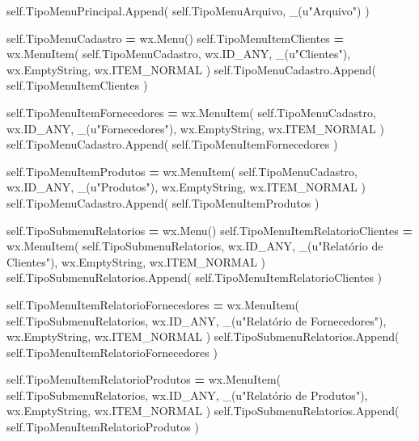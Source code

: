 \documentclass[
]{book}
\newenvironment{Shaded}{\begin{snugshade}}{\end{snugshade}}
\newcommand{\NormalTok}[1]{#1}
\newcommand{\OperatorTok}[1]{\textcolor[rgb]{0.81,0.36,0.00}{\textbf{#1}}}
\newcommand{\StringTok}[1]{\textcolor[rgb]{0.31,0.60,0.02}{#1}}
\newcommand{\VariableTok}[1]{\textcolor[rgb]{0.00,0.00,0.00}{#1}}
\begin{document}
\begin{Shaded}
\begin{Highlighting}[]
       \VariableTok{self}\NormalTok{.TipoMenuPrincipal.Append( }\VariableTok{self}\NormalTok{.TipoMenuArquivo, \_(}\StringTok{u"Arquivo"}\NormalTok{) )}

       \VariableTok{self}\NormalTok{.TipoMenuCadastro }\OperatorTok{=}\NormalTok{ wx.Menu()}
       \VariableTok{self}\NormalTok{.TipoMenuItemClientes }\OperatorTok{=}\NormalTok{ wx.MenuItem( }\VariableTok{self}\NormalTok{.TipoMenuCadastro, wx.ID\_ANY, \_(}\StringTok{u"Clientes"}\NormalTok{), wx.EmptyString, wx.ITEM\_NORMAL )}
       \VariableTok{self}\NormalTok{.TipoMenuCadastro.Append( }\VariableTok{self}\NormalTok{.TipoMenuItemClientes )}

       \VariableTok{self}\NormalTok{.TipoMenuItemFornecedores }\OperatorTok{=}\NormalTok{ wx.MenuItem( }\VariableTok{self}\NormalTok{.TipoMenuCadastro, wx.ID\_ANY, \_(}\StringTok{u"Fornecedores"}\NormalTok{), wx.EmptyString, wx.ITEM\_NORMAL )}
       \VariableTok{self}\NormalTok{.TipoMenuCadastro.Append( }\VariableTok{self}\NormalTok{.TipoMenuItemFornecedores )}

       \VariableTok{self}\NormalTok{.TipoMenuItemProdutos }\OperatorTok{=}\NormalTok{ wx.MenuItem( }\VariableTok{self}\NormalTok{.TipoMenuCadastro, wx.ID\_ANY, \_(}\StringTok{u"Produtos"}\NormalTok{), wx.EmptyString, wx.ITEM\_NORMAL )}
       \VariableTok{self}\NormalTok{.TipoMenuCadastro.Append( }\VariableTok{self}\NormalTok{.TipoMenuItemProdutos )}

       \VariableTok{self}\NormalTok{.TipoSubmenuRelatorios }\OperatorTok{=}\NormalTok{ wx.Menu()}
       \VariableTok{self}\NormalTok{.TipoMenuItemRelatorioClientes }\OperatorTok{=}\NormalTok{ wx.MenuItem( }\VariableTok{self}\NormalTok{.TipoSubmenuRelatorios, wx.ID\_ANY, \_(}\StringTok{u"Relatório de Clientes"}\NormalTok{), wx.EmptyString, wx.ITEM\_NORMAL )}
       \VariableTok{self}\NormalTok{.TipoSubmenuRelatorios.Append( }\VariableTok{self}\NormalTok{.TipoMenuItemRelatorioClientes )}

       \VariableTok{self}\NormalTok{.TipoMenuItemRelatorioFornecedores }\OperatorTok{=}\NormalTok{ wx.MenuItem( }\VariableTok{self}\NormalTok{.TipoSubmenuRelatorios, wx.ID\_ANY, \_(}\StringTok{u"Relatório de Fornecedores"}\NormalTok{), wx.EmptyString, wx.ITEM\_NORMAL )}
       \VariableTok{self}\NormalTok{.TipoSubmenuRelatorios.Append( }\VariableTok{self}\NormalTok{.TipoMenuItemRelatorioFornecedores )}

       \VariableTok{self}\NormalTok{.TipoMenuItemRelatorioProdutos }\OperatorTok{=}\NormalTok{ wx.MenuItem( }\VariableTok{self}\NormalTok{.TipoSubmenuRelatorios, wx.ID\_ANY, \_(}\StringTok{u"Relatório de Produtos"}\NormalTok{), wx.EmptyString, wx.ITEM\_NORMAL )}
       \VariableTok{self}\NormalTok{.TipoSubmenuRelatorios.Append( }\VariableTok{self}\NormalTok{.TipoMenuItemRelatorioProdutos )}


\end{Highlighting}
\end{Shaded}
\end{document}
